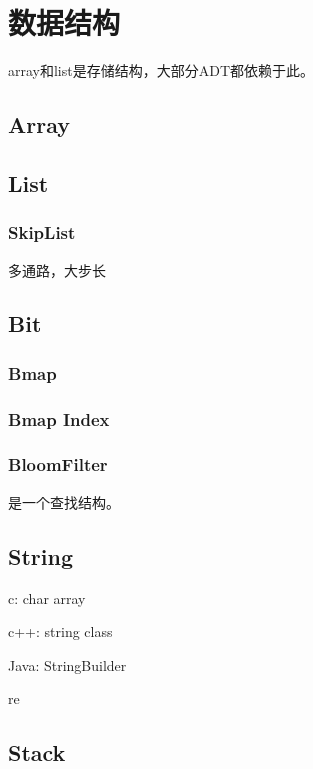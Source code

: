 \chapter{数据结构}

array和list是存储结构，大部分ADT都依赖于此。

\section{Array}

\section{List}

\subsection{SkipList}

多通路，大步长

\section{Bit}

\subsection{Bmap}

\subsection{Bmap Index}

\subsection{BloomFilter}

是一个查找结构。

\section{String}

\begin{enumbox}
\item c: char array
\item c++: string class
\item Java: StringBuilder
\item re
\end{enumbox}

\section{Stack}

